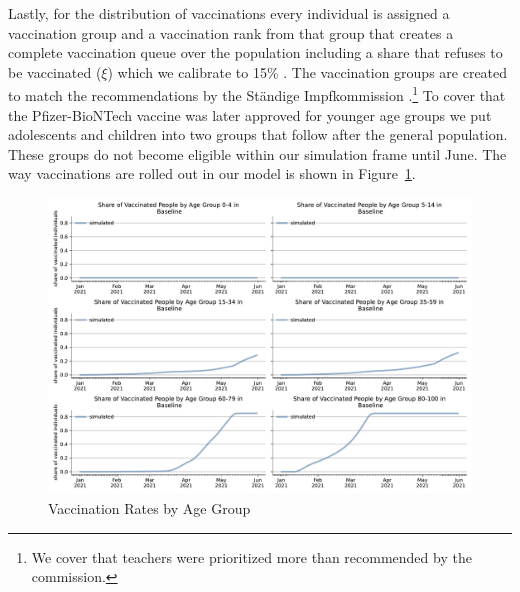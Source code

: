 Lastly, for the distribution of vaccinations every individual is assigned a vaccination
group and a vaccination rank from that group that creates a complete vaccination queue
over the population including a share that refuses to be vaccinated ($\xi$) which we
calibrate to  15\% \citep{RKI2021c}. The vaccination groups are created to match the
recommendations by the Ständige Impfkommission \citep{VygenBonnet2020}.\footnote{We cover
that teachers were prioritized more than recommended by the commission.} To cover that
the Pfizer-BioNTech vaccine was later approved for younger age groups we put adolescents
and children into two groups that follow after the general population. These groups do
not become eligible within our simulation frame until June. The way vaccinations are
rolled out in our model is shown in Figure~\ref{fig:vaccinations_by_age_group}.

\begin{figure}[ht]   %
  \centering
  \includegraphics[width=\textwidth]{figures/results/figures/vaccinations/spring_baseline}
  \caption{Vaccination Rates by Age Group}
  \label{fig:vaccinations_by_age_group}
\end{figure}

\FloatBarrier
